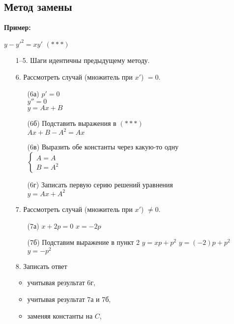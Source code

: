 \documentclass[10pt, a4paper]{article}
\begin{document}
\subsection{Метод замены}
\textbf{Пример:}
\par $y - y'^2 = xy'$ $(***)$
\begin{enumerate}
    \item[1--5.] Шаги идентичны предыдущему методу.
    \item[6.] Рассмотреть случай (множитель при $x'$) $= 0$.
        \begin{itemize}
            \item[(6а)] $p' = 0$ \\
                        $y'' = 0$ \\
                        $y = Ax + B$
            \item[(6б)] Подставить выражения в $(***)$ \\
                        $Ax + B - A^2 = Ax$
            \item[(6в)] Выразить обе константы через какую-то одну \\
                        $\begin{cases}
                            A = A \\
                            B = A^2
                        \end{cases}$
            \item[(6г)] Записать первую серию решений уравнения \\
                        $y = Ax + A^2$
        \end{itemize}
    \item[7.] Рассмотреть случай (множитель при $x'$) $\neq 0$.
        \begin{itemize}
            \item[(7а)] $x + 2p = 0$
                        $x = -2p$
            \item[(7б)] Подставим выражение в пункт 2
                        $y = xp + p^2$
                        $y = (-2)p + p^2$
                        $y = -p^2$
        \end{itemize}
    \item[8.]   Записать ответ
        \begin{itemize}
            \item учитывая результат 6г,
            \item учитывая результат 7а и 7б,
            \item заменяя константы на $C$,

\end{itemize}
\end{enumerate}
\end{document}
